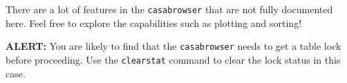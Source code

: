 There are a lot of features in the {\tt casabrowser}
that are not fully documented here.  Feel free to explore the
capabilities such as plotting and sorting!

{\bf ALERT:} You are likely to find that the {\tt casabrowser}
needs to get a table lock before proceeding.  Use the {\tt clearstat}
command to clear the lock status in this case.



%


